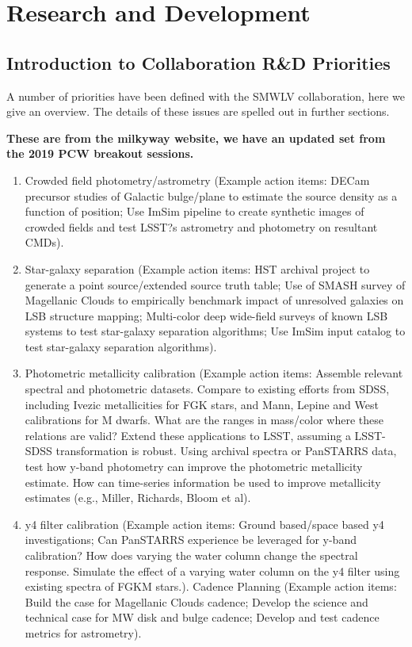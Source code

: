 \section{Research and Development}

\subsection{Introduction to Collaboration R\&D Priorities}

A number of priorities have been defined with the SMWLV collaboration, here we give an overview. The details of these issues are spelled out in further sections.

{\bf These are from the milkyway website, we have an updated set from the 2019 PCW breakout sessions.}

\begin{enumerate}

\item{Crowded field photometry/astrometry (Example action items: DECam precursor studies of Galactic bulge/plane to estimate the source density as a function of position; Use ImSim pipeline to create synthetic images of crowded fields and test LSST?s astrometry and photometry on resultant CMDs).}

\item{Star-galaxy separation (Example action items: HST archival project to generate a point source/extended source truth table; Use of SMASH survey of Magellanic Clouds to empirically benchmark impact of unresolved galaxies on LSB structure mapping; Multi-color deep wide-field surveys of known LSB systems to test star-galaxy separation algorithms; Use ImSim input catalog to test star-galaxy separation algorithms).}

\item{Photometric metallicity calibration (Example action items: Assemble relevant spectral and photometric datasets. Compare to existing efforts from SDSS, including Ivezic metallicities for FGK stars, and Mann, Lepine and West calibrations for M dwarfs. What are the ranges in mass/color where these relations are valid? Extend these applications to LSST, assuming a LSST-SDSS transformation is robust. Using archival spectra or PanSTARRS data, test how y-band photometry can improve the photometric metallicity estimate. How can time-series information be used to improve metallicity estimates (e.g., Miller, Richards, Bloom et al).}

\item{y4 filter calibration (Example action items: Ground based/space based y4 investigations; Can PanSTARRS experience be leveraged for y-band calibration? How does varying the water column change the spectral response. Simulate the effect of a varying water column on the y4 filter using existing spectra of FGKM stars.).
Cadence Planning (Example action items: Build the case for Magellanic Clouds cadence; Develop the science and technical case for MW disk and bulge cadence; Develop and test cadence metrics for astrometry).}


\end{enumerate}
